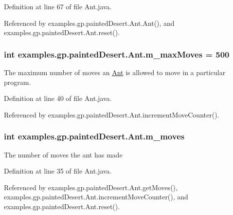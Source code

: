 Definition at line 67 of file Ant.\-java.



Referenced by examples.\-gp.\-painted\-Desert.\-Ant.\-Ant(), and examples.\-gp.\-painted\-Desert.\-Ant.\-reset().

\hypertarget{classexamples_1_1gp_1_1painted_desert_1_1_ant_a1db29299cd14dcfea37f4b09a123dcb9}{
\subsubsection[{m\-\_\-max\-Moves}]{\setlength{\rightskip}{0pt plus 5cm}int examples.\-gp.\-painted\-Desert.\-Ant.\-m\-\_\-max\-Moves = 500\hspace{0.3cm}{\ttfamily [private]}}}\label{classexamples_1_1gp_1_1painted_desert_1_1_ant_a1db29299cd14dcfea37f4b09a123dcb9}
The maximum number of moves an \hyperlink{classexamples_1_1gp_1_1painted_desert_1_1_ant}{Ant} is allowed to move in a particular program. 

Definition at line 40 of file Ant.\-java.



Referenced by examples.\-gp.\-painted\-Desert.\-Ant.\-increment\-Move\-Counter().

\hypertarget{classexamples_1_1gp_1_1painted_desert_1_1_ant_a7483963fda857bdc4178d409d8660f76}{
\subsubsection[{m\-\_\-moves}]{\setlength{\rightskip}{0pt plus 5cm}int examples.\-gp.\-painted\-Desert.\-Ant.\-m\-\_\-moves\hspace{0.3cm}{\ttfamily [private]}}}\label{classexamples_1_1gp_1_1painted_desert_1_1_ant_a7483963fda857bdc4178d409d8660f76}
The number of moves the ant has made 

Definition at line 35 of file Ant.\-java.



Referenced by examples.\-gp.\-painted\-Desert.\-Ant.\-get\-Moves(), examples.\-gp.\-painted\-Desert.\-Ant.\-increment\-Move\-Counter(), and examples.\-gp.\-painted\-Desert.\-Ant.\-reset().

